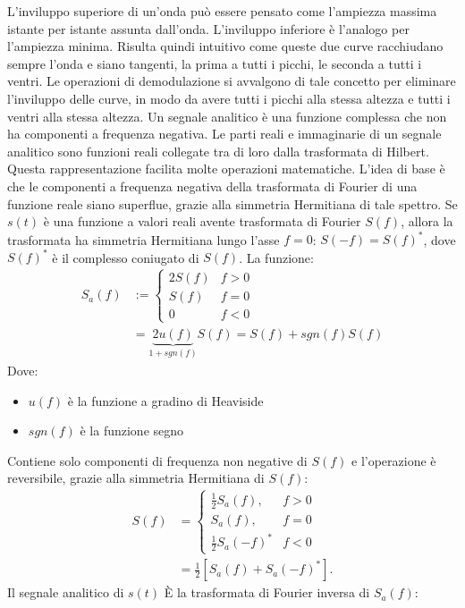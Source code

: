 \documentclass[a4paper, 12pt]{book}
\begin{document}
L'inviluppo superiore di un'onda può essere pensato come l'ampiezza massima istante per istante assunta dall'onda.
L'inviluppo inferiore è l'analogo per l'ampiezza minima.
Risulta quindi intuitivo come queste due curve racchiudano sempre l'onda e siano tangenti, la prima a tutti i picchi, le seconda a tutti i ventri.
Le operazioni di demodulazione si avvalgono di tale concetto per eliminare l'inviluppo delle curve, in modo da avere tutti i picchi alla stessa altezza e tutti i ventri alla stessa altezza.
\newline
Un segnale analitico è una funzione complessa che non ha componenti a frequenza negativa.
Le parti reali e immaginarie di un segnale analitico sono funzioni reali collegate tra di loro dalla trasformata di Hilbert.
Questa rappresentazione facilita molte operazioni matematiche.
L’idea di base è che le componenti a frequenza negativa della trasformata di Fourier di una funzione reale siano superflue, grazie alla simmetria Hermitiana di tale spettro.
Se $s(t)$ è una funzione a valori reali avente trasformata di Fourier $S(f)$, allora la trasformata ha simmetria Hermitiana lungo l’asse $f=0$:
$S(-f)=S(f)^*$, dove $S(f)^*$ è il complesso coniugato di $S(f)$. La funzione:
\begin{align}
	S_a(f) &:= \begin{cases} 2S(f) & f>0 \\ S(f) & f=0 \\ 0 & f<0 \end{cases} \\
	&= \underbrace{2u(f)}_{1+sgn(f)}S(f) = S(f)+sgn(f)S(f)
\end{align}
Dove:
\begin{itemize}
	\item $u(f)$ è la funzione a gradino di Heaviside
	\item $sgn(f)$ è la funzione segno
\end{itemize}
Contiene solo componenti di frequenza non negative di $S(f)$ e l’operazione è reversibile, grazie alla simmetria Hermitiana di $S(f)$:
\begin{align}
	S(f) &= \begin{cases} \frac{1}{2} S_a (f), & f>0 \\ S_a(f), & f=0 \\ \frac{1}{2}			S_a(-f)^* & f<0 \end{cases} \\
	&=\frac{1}{2}[S_a(f)+S_a(-f)^*].
\end{align}
Il segnale analitico di $s(t)$
È la trasformata di Fourier inversa di $S_a(f)$:
\end{document}
